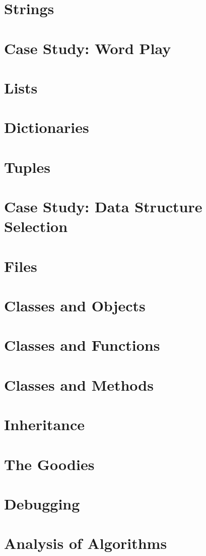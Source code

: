 \documentclass[a4paper,11pt]{book}
\begin{document}
\chapter{Strings}
\chapter{Case Study: Word Play}
\chapter{Lists}
\chapter{Dictionaries}
\chapter{Tuples}
\chapter{Case Study: Data Structure Selection}
\chapter{Files}
\chapter{Classes and Objects}
\chapter{Classes and Functions}
\chapter{Classes and Methods}
\chapter{Inheritance}
\chapter{The Goodies}
\chapter{Debugging}
\chapter{Analysis of Algorithms}
\end{document}
